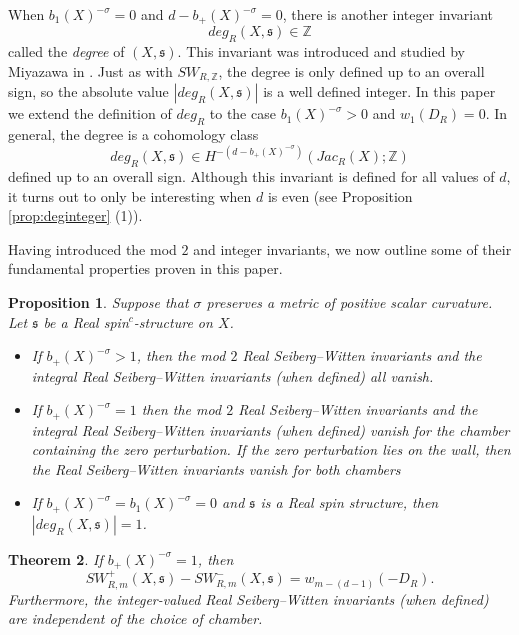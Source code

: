 \documentclass{amsart}
\newtheorem{theorem}{Theorem}[section]
\newtheorem{proposition}[theorem]{Proposition}
\theoremstyle{definition}
\theoremstyle{remark}
\numberwithin{equation}{section}
\begin{document}
When $b_1(X)^{-\sigma} = 0$ and $d - b_+(X)^{-\sigma} = 0$, there is another integer invariant
\[
deg_R(X , \mathfrak{s}) \in \mathbb{Z}
\]
called the {\em degree} of $(X , \mathfrak{s})$. This invariant was introduced and studied by Miyazawa in \cite{mi}. Just as with $SW_{R,\mathbb{Z}}$, the degree is only defined up to an overall sign, so the absolute value $|deg_R(X,\mathfrak{s})|$ is a well defined integer. In this paper we extend the definition of $deg_R$ to the case $b_1(X)^{-\sigma} > 0$ and $w_1(D_R)=0$. In general, the degree is a cohomology class
\[
deg_R(X,\mathfrak{s}) \in H^{-(d-b_+(X)^{-\sigma})}(Jac_R(X) ; \mathbb{Z})
\]
defined up to an overall sign. Although this invariant is defined for all values of $d$, it turns out to only be interesting when $d$ is even (see Proposition \ref{prop:deginteger} (1)).



Having introduced the mod $2$ and integer invariants, we now outline some of their fundamental properties proven in this paper.


\begin{proposition}
Suppose that $\sigma$ preserves a metric of positive scalar curvature. Let $\mathfrak{s}$ be a Real spin$^c$-structure on $X$.
\begin{itemize}
\item[(1)]{If $b_+(X)^{-\sigma} > 1$, then the mod $2$ Real Seiberg--Witten invariants and the integral Real Seiberg--Witten invariants (when defined) all vanish.}
\item[(2)]{If $b_+(X)^{-\sigma} = 1$ then the mod $2$ Real Seiberg--Witten invariants and the integral Real Seiberg--Witten invariants (when defined) vanish for the chamber containing the zero perturbation. If the zero perturbation lies on the wall, then the Real Seiberg--Witten invariants vanish for both chambers}
\item[(3)]{If $b_+(X)^{-\sigma} = b_1(X)^{-\sigma} = 0$ and $\mathfrak{s}$ is a Real spin structure, then $|deg_R(X , \mathfrak{s})| = 1$.}
\end{itemize}

\end{proposition}


\begin{theorem}
If $b_+(X)^{-\sigma}=1$, then
\[
SW^+_{R,m}(X,\mathfrak{s}) - SW^-_{R,m}(X, \mathfrak{s}) = w_{m-(d-1)}(-D_R).
\]
Furthermore, the integer-valued Real Seiberg--Witten invariants (when defined) are independent of the choice of chamber.
\end{theorem}
\end{document}
